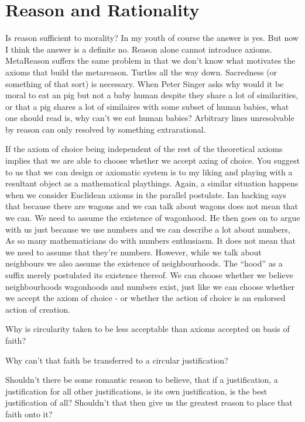 \chapter{Reason and Rationality}
Is reason sufficient to morality? In my youth of course the answer is yes. But now I think the answer is a definite no. Reason alone cannot introduce axioms. MetaReason suffers the same problem in that we don’t know what motivates the axioms that build the metareason. Turtles all the way down. Sacredness (or something of that sort) is necessary. When Peter Singer asks why would it be moral to eat an pig but not a baby human despite they share a lot of similarities, or that a pig shares a lot of similaires with some subset of human babies, what one should read is, why can’t we eat human babies? Arbitrary lines unresolvable by reason can only resolved by something extrarational. 



If the axiom of choice being independent of the rest of the theoretical axioms implies that we are able to choose whether we accept axing of choice. You suggest to us that we can design or axiomatic system is to my liking and playing with a resultant object as a mathematical playthings. Again, a similar situation happens when we consider Euclidean axioms in the parallel postulate. Ian hacking says that because there are wagons and we can talk about wagons does not mean that we can. We need to assume the existence of wagonhood. He then goes on to argue with us just because we use numbers and we can describe a lot about numbers, As so many mathematicians do with numbers enthusiasm. It does not mean that we need to assume that they’re numbers. However, while we talk about neighbours we also assume the existence of neighbourhoods. The “hood” as a suffix merely postulated its existence thereof. We can choose whether we believe neighbourhoods wagonhoods and numbers exist, just like we can choose whether we accept the axiom of choice - or whether the action of choice is an endorsed action of creation. 


Why is circularity taken to be less acceptable than axioms accepted on basis of faith? 

Why can’t that faith be transferred to a circular justification?

Shouldn’t there be some romantic reason to believe, that if a justification, a justification for all other justifications, is its own justification, is the best justification of all? Shouldn’t that then give us the greatest reason to place that faith onto it? 

